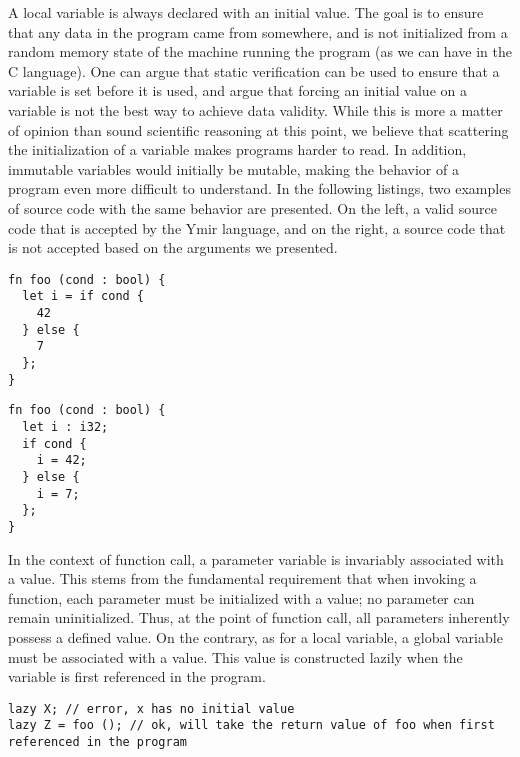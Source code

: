 A local variable is always declared with an initial value. The goal is to ensure
that any data in the program came from somewhere, and is not initialized from a
random memory state of the machine running the program (as we can have in the C
language). One can argue that static verification can be used to ensure that a
variable is set before it is used, and argue that forcing an initial value on a
variable is not the best way to achieve data validity. While this is more a
matter of opinion than sound scientific reasoning at this point, we believe that
scattering the initialization of a variable makes programs harder to read. In
addition, immutable variables would initially be mutable, making the behavior of
a program even more difficult to understand. In the following listings, two
examples of source code with the same behavior are presented. On the left, a
valid source code that is accepted by the Ymir language, and on the right, a
source code that is not accepted based on the arguments we presented.

\hspace{-15pt}%
\begin{minipage}[t][][t]{0.47\linewidth}
  \begin{lstlisting}[style=coloredverbatim, escapechar=@, caption=Valid]
fn foo (cond : bool) {
  let i = if cond {
    42
  } else {
    7
  };
}
  \end{lstlisting}
\end{minipage}\hspace{10pt}%
\begin{minipage}[t][][t]{0.47\linewidth}
  \begin{lstlisting}[style=coloredverbatim, escapechar=@, caption=Invalid]
fn foo (cond : bool) {
  let i : i32;
  if cond {
    i = 42;
  } else {
    i = 7;
  };
}
  \end{lstlisting}
\end{minipage}

In the context of function call, a parameter variable is invariably associated
with a value. This stems from the fundamental requirement that when invoking a
function, each parameter must be initialized with a value; no parameter can
remain uninitialized. Thus, at the point of function call, all parameters
inherently possess a defined value. On the contrary, as for a local variable, a
global variable must be associated with a value. This value is constructed
lazily when the variable is first referenced in the program.

\begin{lstlisting}[style=coloredverbatim]
lazy X; // error, x has no initial value
lazy Z = foo (); // ok, will take the return value of foo when first referenced in the program
\end{lstlisting}

